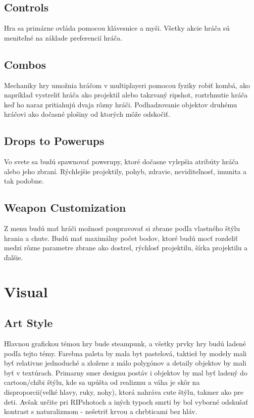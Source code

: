 \documentclass[a4paper]{report}
\begin{document}
\section{Controls}
Hra sa primárne ovláda pomocou klávesnice a myši. Všetky akcie hráča sú meniteľné na základe preferencií hráča. 

\section{Combos}
Mechaniky hry umožnia hráčom v multiplayeri pomocou fyziky robiť kombá, ako napríklad vystreliť hráča ako projektil alebo takzvaný ripshot, roztrhnutie hráča keď ho naraz pritiahujú dvaja rôzny hráči. Podhadzovanie objektov druhému hráčovi ako dočasné plošiny od ktorých môže odskočiť. 

\section{Drops to Powerups}
Vo svete sa budú spawnovať powerupy, ktoré dočasne vylepšia atribúty hráča alebo jeho zbraní. Rýchlejšie projektily, pohyb, zdravie, neviditeľnosť, imunita a tak podobne.

\section{Weapon Customization}
Z menu budú mať hráči možnosť poupravovať si zbrane podľa vlastného štýlu hrania a chute. Budú mať maximálny počet bodov, ktoré budú mocť rozdeliť medzi rôzne parametre zbrane ako dostrel, rýchlosť projektilu, šírka projektilu a ďalšie.
 
\chapter{Visual}
\section{Art Style}
Hlavnou grafickou témou hry bude steampunk, a všetky prvky hry budú ladené podľa tejto témy. Farebna paleta by mala byt pastelová, taktiež by modely mali byť relativne jednoduché a zložene z málo polygónov a detaily objektov by mali byť v textúrach. Primarny smer designu postáv i objektov by mal byť ladený do cartoon/chibi štýlu, kde sa upúšta od realizmu a váha je skôr na disproporcii(velké hlavy, ruky, nohy), ktorá nahráva cute štýlu, takmer ako pre deti. Avšak určite pri RIPshotoch a iných typoch smrti by bol vyborné odskušať kontrast s naturalizmom - nešetriť krvou a chrbticami bez hláv. 
\end{document}
